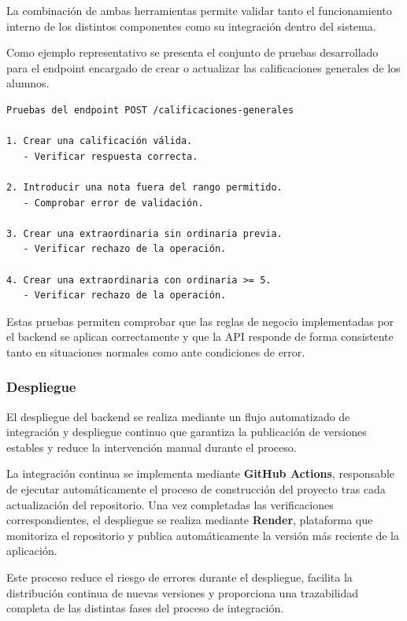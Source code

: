 La combinación de ambas herramientas permite validar tanto el funcionamiento interno de los distintos componentes como su integración dentro del sistema.

Como ejemplo representativo se presenta el conjunto de pruebas desarrollado para el endpoint encargado de crear o actualizar las calificaciones generales de los alumnos.

\begin{Verbatim}[frame=single, fontsize=\small]
Pruebas del endpoint POST /calificaciones-generales

1. Crear una calificación válida.
   - Verificar respuesta correcta.

2. Introducir una nota fuera del rango permitido.
   - Comprobar error de validación.

3. Crear una extraordinaria sin ordinaria previa.
   - Verificar rechazo de la operación.

4. Crear una extraordinaria con ordinaria >= 5.
   - Verificar rechazo de la operación.
\end{Verbatim}

Estas pruebas permiten comprobar que las reglas de negocio implementadas por el backend se aplican correctamente y que la API responde de forma consistente tanto en situaciones normales como ante condiciones de error.

\subsubsection{Despliegue}

El despliegue del backend se realiza mediante un flujo automatizado de integración y despliegue continuo que garantiza la publicación de versiones estables y reduce la intervención manual durante el proceso.

La integración continua se implementa mediante \textbf{GitHub Actions}, responsable de ejecutar automáticamente el proceso de construcción del proyecto tras cada actualización del repositorio. Una vez completadas las verificaciones correspondientes, el despliegue se realiza mediante \textbf{Render}, plataforma que monitoriza el repositorio y publica automáticamente la versión más reciente de la aplicación.

Este proceso reduce el riesgo de errores durante el despliegue, facilita la distribución continua de nuevas versiones y proporciona una trazabilidad completa de las distintas fases del proceso de integración.

